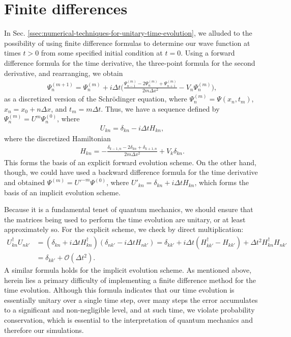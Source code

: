 \appendix

\section{Finite differences}
\label{app:finite-differences}

In Sec. \ref{ssec:numerical-techniques-for-unitary-time-evolution}, we alluded to the possibility of using finite difference formulas to determine our wave function at times $t > 0$ from some specified initial condition at $t = 0$.
Using a forward difference formula for the time derivative, the three-point formula for the second derivative, and rearranging, we obtain
\begin{align}
    \Psi_{n}^{(m + 1)} = \Psi_{n}^{(m)} + i \Delta t \Bigg( \frac{\Psi_{n-1}^{(m)} - 2 \Psi_{n}^{(m)} + \Psi_{n+1}^{(m)}}{2m \Delta x^2} - V_{n} \Psi_{n}^{(m)} \Bigg)
,\end{align}
as a discretized version of the Schr\"{o}dinger equation, where $\Psi_{n}^{(m)} = \Psi(x_n,t_{m})$, $x_{n} = x_0 + n \Delta x$, and $t_{m} = m \Delta t$.
Thus, we have a sequence defined by $\Psi_{n}^{(m)} = U^{m} \Psi_{n}^{(0)}$, where
\begin{align}
    U_{kn} = \delta_{kn} - i \Delta t H_{kn}
,\end{align}
where the discretized Hamiltonian
\begin{align}
    H_{kn} = -\frac{\delta_{k-1,n} - 2 \delta_{kn} + \delta_{k+1,n}}{2m \Delta x^2} + V_{k} \delta_{kn}
.\end{align}
This forms the basis of an explicit forward evolution scheme.
On the other hand, though, we could have used a backward difference formula for the time derivative and obtained $\Psi^{(m)} = U'^{-m} \Psi^{(0)}$, where $U'_{kn} = \delta_{kn} + i \Delta t H_{kn}$, which forms the basis of an implicit evolution scheme.

Because it is a fundamental tenet of quantum mechanics, we should ensure that the matrices being used to perform the time evolution are unitary, or at least approximately so.
For the explicit scheme, we check by direct multiplication:
\begin{align}
    U_{kn}^{\dagger} U_{nk'} &= ( \delta_{kn} + i \Delta t H_{kn}^{\dagger} ) ( \delta_{nk'} - i \Delta t H_{nk'} ) = \delta_{k k'} + i \Delta t ( H_{kk'}^{\dagger} - H_{kk'} ) + \Delta t^2 H_{kn}^{\dagger} H_{nk'} \nonumber \\
    &= \delta_{kk'} + \mathcal{O}(\Delta t^2)
.\end{align}
A similar formula holds for the implicit evolution scheme.
As mentioned above, herein lies a primary difficulty of implementing a finite difference method for the time evolution.
Although this formula indicates that our time evolution is essentially unitary over a single time step, over many steps the error accumulates to a significant and non-negligible level, and at such time, we violate probability conservation, which is essential to the interpretation of quantum mechanics and therefore our simulations.

